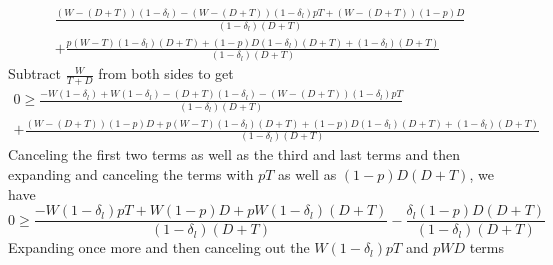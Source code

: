 \documentclass[bibtex,autowc]{apsr_submission}
\newcommand{\de}{\delta}
\begin{document}
{\begin{multline*}
	\frac{(W-(D+T))\left(1-\de_l\right) - (W-(D+T))\left(1-\de_l\right)pT +(W-(D+T))(1-p) D }{\left(1-\de_l\right)\left(D +	 T\right)} \\ 
	+ \frac{p(W-T)\left(1-\de_l\right)\left(D +	 T\right) + (1-p)D\left(1-\de_l\right)\left(D +	 T\right) + \left(1-\de_l\right)\left(D +	 T\right)}{\left(1-\de_l\right)\left(D +	 T\right)}
\end{multline*}
Subtract $\frac{W}{T+D}$ from both sides to get
\begin{multline*}
	0 \geq \frac{-W(1-\de_l) + W\left(1-\de_l\right)-(D+T)\left(1-\de_l\right) - (W-(D+T))\left(1-\de_l\right)pT}{\left(1-\de_l\right)\left(D +	 T\right)} \\ 
	+ \frac{(W-(D+T))(1-p) D + p(W-T)\left(1-\de_l\right)\left(D +	 T\right) + (1-p)D\left(1-\de_l\right)\left(D +	 T\right) + \left(1-\de_l\right)\left(D +	 T\right)}{\left(1-\de_l\right)\left(D +	 T\right)}
\end{multline*}
Canceling the first two terms as well as the third and last terms and then 
expanding and canceling the terms with $pT$ as well as $(1-p)D\left(D +	 T\right)$, we have
\begin{equation*}
	0 \geq \frac{-W\left(1-\de_l\right)pT +W(1-p) D + pW\left(1-\de_l\right)\left(D +	 T\right) }{\left(1-\de_l\right)\left(D +	 T\right)} 
	- \frac{\de_l (1-p)D\left(D +	 T\right)}{\left(1-\de_l\right)\left(D +	 T\right)}
\end{equation*}
Expanding once more and then canceling out the $W\left(1-\de_l\right)pT$ and $pWD$ terms
}
\end{document}
